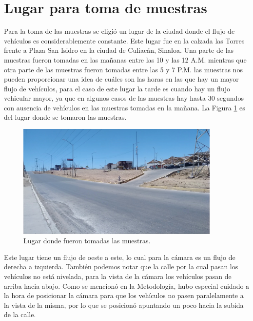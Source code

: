 \section{Lugar para toma de muestras}

Para la toma de las muestras se eligió un lugar de la ciudad donde el flujo de vehículos es considerablemente constante. Este lugar fue en la calzada las Torres frente a Plaza San Isidro en la ciudad de Culiacán, Sinaloa. Una parte de las muestras fueron tomadas en las mañanas entre las 10 y las 12 A.M. mientras que otra parte de las muestras fueron tomadas entre las 5 y 7 P.M. las muestras nos pueden proporcionar una idea de cuáles son las horas en las que hay un mayor flujo de vehículos, para el caso de este lugar la tarde es cuando hay un flujo vehicular mayor, ya que en algunos casos de las muestras hay hasta 30 segundos con ausencia de vehículos en las muestras tomadas en la mañana. La Figura \ref{fig:LugarMuestras} es del lugar donde se tomaron las muestras.

\begin{figure}[H]
    \centering
    \includegraphics[width=0.9\textwidth]{Resultados/imgs/LugarMuestras.jpg}
    \caption{Lugar donde fueron tomadas las muestras.}
    \label{fig:LugarMuestras}
\end{figure}

Este lugar tiene un flujo de oeste a este, lo cual para la cámara es un flujo de derecha a izquierda. También podemos notar que la calle por la cual pasan los vehículos no está nivelada, para la vista de la cámara los vehículos pasan de arriba hacia abajo. Como se mencionó en la Metodología, hubo especial cuidado a la hora de posicionar la cámara para que los vehículos no pasen paralelamente a la vista de la misma, por lo que se posicionó apuntando un poco hacia la subida de la calle.
